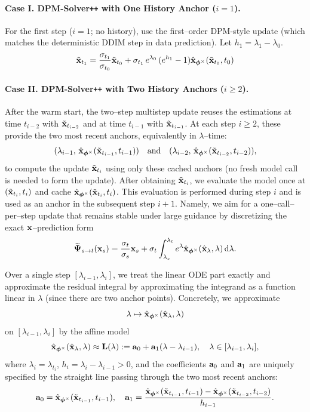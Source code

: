 \paragraph{Case I. DPM-Solver\texttt{++} with One History Anchor ($i= 1$).}
For the first step ($i=1$; no history), use the first–order DPM-style update (which matches the deterministic DDIM step in data prediction). Let $h_1=\lambda_1-\lambda_0$.
\[
\tilde{{\mathbf{x}}}_{t_1}
=
\frac{\sigma_{t_1}}{\sigma_{t_0}} \tilde{{\mathbf{x}}}_{t_0}
 + 
\sigma_{t_1}\,e^{\lambda_{0}}\,(e^{h_1}-1) 
\hat{{\mathbf{x}}}_{\bm{\phi}^\times}(\tilde{{\mathbf{x}}}_{t_0},t_0)
\]

\paragraph{Case II. DPM-Solver\texttt{++} with Two History Anchors ($i\geq 2$).} 



After the warm start, the two–step multistep update reuses the estimations at time $t_{i-2}$ with $\tilde{{\mathbf{x}}}_{t_{i-2}}$ and at time $t_{i-1}$ with $\tilde{{\mathbf{x}}}_{t_{i-1}}$. 
At each step $i\ge2$, these provide the two most recent anchors, equivalently in $\lambda$–time:
\[
(\lambda_{i-1},\,\hat{{\mathbf{x}}}_{\bm{\phi}^\times}(\tilde{{\mathbf{x}}}_{t_{i-1}},t_{i-1}))
\quad\text{and}\quad
(\lambda_{i-2},\,\hat{{\mathbf{x}}}_{\bm{\phi}^\times}(\tilde{{\mathbf{x}}}_{t_{i-2}},t_{i-2})),
\]
to compute the update $\tilde{{\mathbf{x}}}_{t_i}$ using only these cached anchors (no fresh model call is needed to form the update). 
After obtaining $\tilde{{\mathbf{x}}}_{t_i}$, we evaluate the model once at $(\tilde{{\mathbf{x}}}_{t_i},t_i)$ and cache
$\hat{{\mathbf{x}}}_{{\bm{\phi}}^\times}(\tilde{{\mathbf{x}}}_{t_i},t_i)$.
This evaluation is performed during step $i$ and is used as an anchor in the subsequent step $i{+}1$. Namely, we aim for a  one–call–per–step update that remains stable under large guidance by discretizing the exact ${\mathbf{x}}$–prediction form
\begin{align*}
    \widetilde{{\bm{\Psi}}}_{s\to t}({\mathbf{x}}_s)
= \frac{\sigma_t}{\sigma_s} {\mathbf{x}}_s
 + 
\sigma_t \int_{\lambda_s}^{\lambda_t}  e^{\lambda} 
\hat{{\mathbf{x}}}_{\bm{\phi}^\times}(\hat{{\mathbf{x}}}_\lambda,\lambda) \mathop{}\!\mathrm{d}\lambda.
\end{align*}
 
Over a single step $[\lambda_{i-1},\lambda_i]$, we treat the linear ODE part exactly and approximate the residual integral by approximating the integrand as a function linear in $\lambda$ (since there are two anchor points). 
Concretely, we approximate
\[
\lambda  \mapsto  \hat{{\mathbf{x}}}_{\bm{\phi}^\times}(\hat{{\mathbf{x}}}_{\lambda},\lambda)
\]
on $[\lambda_{i-1},\lambda_i]$ by the affine model
\[
\hat{{\mathbf{x}}}_{\bm{\phi}^\times}(\hat{{\mathbf{x}}}_{\lambda},\lambda) 
 \approx  {\mathbf{L}}(\lambda):={\mathbf{a}}_0+{\mathbf{a}}_1(\lambda-\lambda_{i-1}), 
\quad \lambda \in [\lambda_{i-1},\lambda_i],
\]
where $\lambda_i=\lambda_{t_i}$, $h_i=\lambda_i-\lambda_{i-1}>0$, and the coefficients ${\mathbf{a}}_0$ and ${\mathbf{a}}_1$ are uniquely specified by the 
straight line passing through the two most recent anchors:
\[
{\mathbf{a}}_0=\hat{{\mathbf{x}}}_{\bm{\phi}^\times}(\tilde{{\mathbf{x}}}_{t_{i-1}},t_{i-1}), 
\quad
{\mathbf{a}}_1=\frac{\hat{{\mathbf{x}}}_{\bm{\phi}^\times}(\tilde{{\mathbf{x}}}_{t_{i-1}},t_{i-1})-\hat{{\mathbf{x}}}_{\bm{\phi}^\times}(\tilde{{\mathbf{x}}}_{t_{i-2}},t_{i-2})}{h_{i-1}}.
\]


